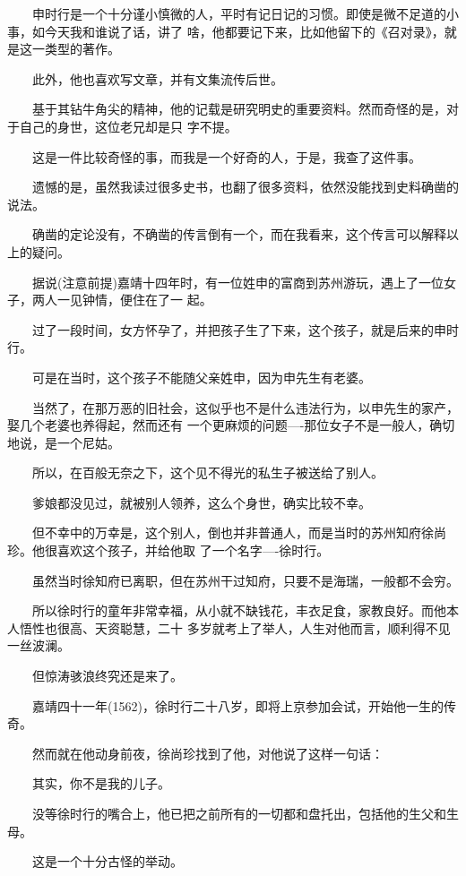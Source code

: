 \documentclass[11pt,a4paper,onecolumn]{article}
\begin{document}
　　申时行是一个十分谨小慎微的人，平时有记日记的习惯。即使是微不足道的小事，如今天我和谁说了话，讲了
啥，他都要记下来，比如他留下的《召对录》，就是这一类型的著作。

　　此外，他也喜欢写文章，并有文集流传后世。

　　基于其钻牛角尖的精神，他的记载是研究明史的重要资料。然而奇怪的是，对于自己的身世，这位老兄却是只
字不提。

　　这是一件比较奇怪的事，而我是一个好奇的人，于是，我查了这件事。

　　遗憾的是，虽然我读过很多史书，也翻了很多资料，依然没能找到史料确凿的说法。

　　确凿的定论没有，不确凿的传言倒有一个，而在我看来，这个传言可以解释以上的疑问。

　　据说(注意前提)嘉靖十四年时，有一位姓申的富商到苏州游玩，遇上了一位女子，两人一见钟情，便住在了一
起。

　　过了一段时间，女方怀孕了，并把孩子生了下来，这个孩子，就是后来的申时行。

　　可是在当时，这个孩子不能随父亲姓申，因为申先生有老婆。

　　当然了，在那万恶的旧社会，这似乎也不是什么违法行为，以申先生的家产，娶几个老婆也养得起，然而还有
一个更麻烦的问题----那位女子不是一般人，确切地说，是一个尼姑。

　　所以，在百般无奈之下，这个见不得光的私生子被送给了别人。

　　爹娘都没见过，就被别人领养，这么个身世，确实比较不幸。

　　但不幸中的万幸是，这个别人，倒也并非普通人，而是当时的苏州知府徐尚珍。他很喜欢这个孩子，并给他取
了一个名字----徐时行。

　　虽然当时徐知府已离职，但在苏州干过知府，只要不是海瑞，一般都不会穷。

　　所以徐时行的童年非常幸福，从小就不缺钱花，丰衣足食，家教良好。而他本人悟性也很高、天资聪慧，二十
多岁就考上了举人，人生对他而言，顺利得不见一丝波澜。

　　但惊涛骇浪终究还是来了。

　　嘉靖四十一年(1562)，徐时行二十八岁，即将上京参加会试，开始他一生的传奇。

　　然而就在他动身前夜，徐尚珍找到了他，对他说了这样一句话：

　　其实，你不是我的儿子。

　　没等徐时行的嘴合上，他已把之前所有的一切都和盘托出，包括他的生父和生母。

　　这是一个十分古怪的举动。

\section[\thesection]{}
\end{document}
